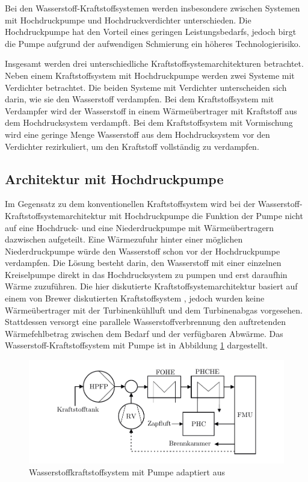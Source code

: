 Bei den Wasserstoff-Kraftstoffsystemen werden insbesondere zwischen Systemen mit Hochdruckpumpe und Hochdruckverdichter unterschieden. Die Hochdruckpumpe hat den Vorteil eines geringen Leistungsbedarfs, jedoch birgt die Pumpe aufgrund der aufwendigen Schmierung ein höheres Technologierisiko. 

Insgesamt werden drei unterschiedliche Kraftstoffsystemarchitekturen betrachtet. Neben einem Kraftstoffsystem mit Hochdruckpumpe werden zwei Systeme mit Verdichter betrachtet. Die beiden Systeme mit Verdichter unterscheiden sich darin, wie sie den Wasserstoff verdampfen. Bei dem Kraftstoffsystem mit Verdampfer wird der Wasserstoff in einem Wärmeübertrager mit Kraftstoff aus dem Hochdrucksystem verdampft. Bei dem Kraftstoffsystem mit Vormischung wird eine geringe Menge Wasserstoff aus dem Hochdrucksystem vor den Verdichter rezirkuliert, um den Kraftstoff vollständig zu verdampfen.

\subsection{Architektur mit Hochdruckpumpe}

Im Gegensatz zu dem konventionellen Kraftstoffsystem wird bei der Wasserstoff-Kraftstoffsystemarchitektur mit Hochdruckpumpe die Funktion der Pumpe nicht auf eine Hochdruck- und eine Niederdruckpumpe mit Wärmeübertragern dazwischen aufgeteilt. Eine Wärmezufuhr hinter einer möglichen Niederdruckpumpe würde den Wasserstoff schon vor der Hochdruckpumpe verdampfen. Die Lösung besteht darin, den Wasserstoff mit einer einzelnen Kreiselpumpe direkt in das Hochdrucksystem zu pumpen und erst daraufhin Wärme zuzuführen. Die hier diskutierte Kraftstoffsystemarchitektur basiert auf einem von Brewer diskutierten Kraftstoffsystem \cite{Brewer.1991}, jedoch wurden keine Wärmeübertrager mit der Turbinenkühlluft und dem Turbinenabgas vorgesehen. Stattdessen versorgt eine parallele Wasserstoffverbrennung den auftretenden Wärmefehlbetrag zwischen dem Bedarf und der verfügbaren Abwärme. Das Wasserstoff-Kraftstoffsystem mit Pumpe ist in  Abbildung \ref{fig:pumpe} dargestellt.

\begin{figure}[ht]
\centering
\includegraphics[width=1\linewidth]{4_Abbildungen/2_Hauptteil/Kraftstoffsystem Abbildungen/pump.pdf}
  \caption{Wasserstoffkraftstoffsystem mit Pumpe adaptiert aus \cite{Brewer.1991}}
  \label{fig:pumpe}
\end{figure}
\FloatBarrier 

